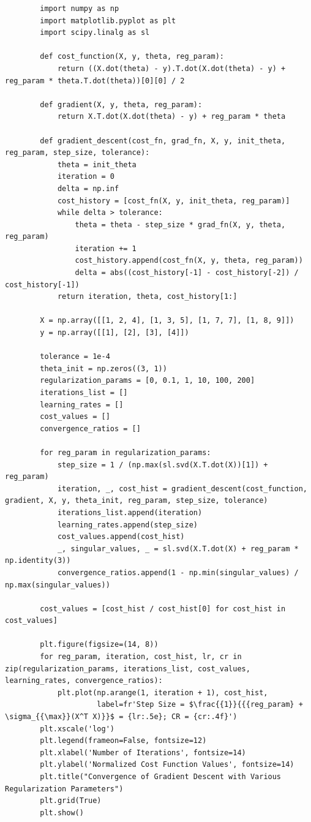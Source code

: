 \documentclass[11pt]{article}
\begin{document}
	\begin{verbatim}
		import numpy as np
		import matplotlib.pyplot as plt
		import scipy.linalg as sl
		
		def cost_function(X, y, theta, reg_param):
			return ((X.dot(theta) - y).T.dot(X.dot(theta) - y) + reg_param * theta.T.dot(theta))[0][0] / 2
		
		def gradient(X, y, theta, reg_param):
			return X.T.dot(X.dot(theta) - y) + reg_param * theta
		
		def gradient_descent(cost_fn, grad_fn, X, y, init_theta, reg_param, step_size, tolerance):
			theta = init_theta
			iteration = 0
			delta = np.inf
			cost_history = [cost_fn(X, y, init_theta, reg_param)]
			while delta > tolerance:
				theta = theta - step_size * grad_fn(X, y, theta, reg_param)
				iteration += 1
				cost_history.append(cost_fn(X, y, theta, reg_param))
				delta = abs((cost_history[-1] - cost_history[-2]) / cost_history[-1])
			return iteration, theta, cost_history[1:]
		
		X = np.array([[1, 2, 4], [1, 3, 5], [1, 7, 7], [1, 8, 9]])
		y = np.array([[1], [2], [3], [4]])
		
		tolerance = 1e-4
		theta_init = np.zeros((3, 1))  
		regularization_params = [0, 0.1, 1, 10, 100, 200]  
		iterations_list = []  
		learning_rates = []  
		cost_values = []  
		convergence_ratios = []  
		
		for reg_param in regularization_params:
			step_size = 1 / (np.max(sl.svd(X.T.dot(X))[1]) + reg_param)
			iteration, _, cost_hist = gradient_descent(cost_function, gradient, X, y, theta_init, reg_param, step_size, tolerance)
			iterations_list.append(iteration)
			learning_rates.append(step_size)
			cost_values.append(cost_hist)
			_, singular_values, _ = sl.svd(X.T.dot(X) + reg_param * np.identity(3))
			convergence_ratios.append(1 - np.min(singular_values) / np.max(singular_values))
		
		cost_values = [cost_hist / cost_hist[0] for cost_hist in cost_values]
		
		plt.figure(figsize=(14, 8))
		for reg_param, iteration, cost_hist, lr, cr in zip(regularization_params, iterations_list, cost_values, learning_rates, convergence_ratios):
			plt.plot(np.arange(1, iteration + 1), cost_hist, 
					 label=fr'Step Size = $\frac{{1}}{{{reg_param} + \sigma_{{\max}}(X^T X)}}$ = {lr:.5e}; CR = {cr:.4f}')
		plt.xscale('log')
		plt.legend(frameon=False, fontsize=12)
		plt.xlabel('Number of Iterations', fontsize=14)
		plt.ylabel('Normalized Cost Function Values', fontsize=14)
		plt.title("Convergence of Gradient Descent with Various Regularization Parameters")
		plt.grid(True)
		plt.show()
	\end{verbatim}	
	\newpage
	
\end{document}
